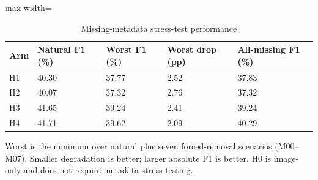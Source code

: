 \begin{table}[t]
\centering
\small
\caption{Missing-metadata stress-test performance}
\label{tab:08-metadata-robustness}
\begin{adjustbox}{max width=\textwidth}
\begin{tabular}{lllll}
\toprule
\textbf{Arm} & \textbf{Natural F1 (\%)} & \textbf{Worst F1 (\%)} & \textbf{Worst drop (pp)} & \textbf{All-missing F1 (\%)} \\
\midrule
H1 & 40.30 & 37.77 & 2.52 & 37.83 \\
H2 & 40.07 & 37.32 & 2.76 & 37.32 \\
H3 & 41.65 & 39.24 & 2.41 & 39.24 \\
H4 & 41.71 & 39.62 & 2.09 & 40.29 \\
\bottomrule
\end{tabular}
\end{adjustbox}
\par\smallskip
\begin{minipage}{\textwidth}\footnotesize Worst is the minimum over natural plus seven forced-removal scenarios (M00--M07). Smaller degradation is better; larger absolute F1 is better. H0 is image-only and does not require metadata stress testing.\end{minipage}
\end{table}
